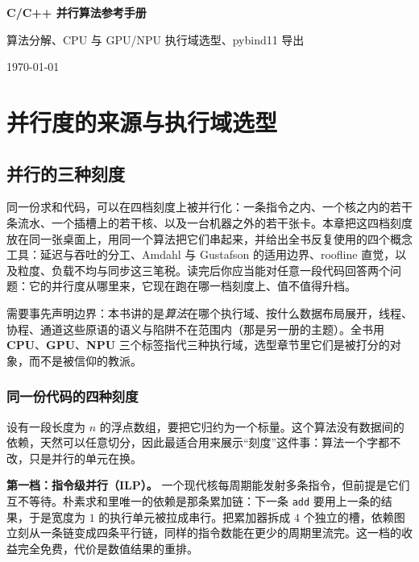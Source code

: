 \documentclass[12pt,a4paper,fontset=fandol]{ctexbook}
\newcommand{\Tp}[1]{\texttt{#1}}
\newcommand{\Dom}[1]{\textsf{\bfseries #1}}
\newcommand{\CPU}{\Dom{CPU}}
\newcommand{\GPU}{\Dom{GPU}}
\newcommand{\NPU}{\Dom{NPU}}
\begin{document}
\frontmatter

\begin{titlepage}
\centering
\vspace*{4cm}
{\Huge\bfseries C/C++ 并行算法参考手册\par}
\vspace{1cm}
{\LARGE 算法分解、CPU 与 GPU/NPU 执行域选型、pybind11 导出\par}
\vfill
{\large \today\par}
\end{titlepage}

\tableofcontents

\mainmatter

\cleardoublepage

\part{并行度的来源与执行域选型}

\chapter{并行的三种刻度}

同一份求和代码，可以在四档刻度上被并行化：一条指令之内、一个核之内的若干条流水、一个插槽上的若干核、以及一台机器之外的若干张卡。本章把这四档刻度放在同一张桌面上，用同一个算法把它们串起来，并给出全书反复使用的四个概念工具：延迟与吞吐的分工、Amdahl 与 Gustafson 的适用边界、roofline 直觉，以及粒度、负载不均与同步这三笔税。读完后你应当能对任意一段代码回答两个问题：它的并行度从哪里来，它现在跑在哪一档刻度上、值不值得升档。

需要事先声明边界：本书讲的是\emph{算法}在哪个执行域、按什么数据布局展开，线程、协程、通道这些原语的语义与陷阱不在范围内（那是另一册的主题）。全书用 \CPU、\GPU、\NPU{} 三个标签指代三种执行域，选型章节里它们是被打分的对象，而不是被信仰的教派。

\section{同一份代码的四种刻度}

设有一段长度为 $n$ 的浮点数组，要把它归约为一个标量。这个算法没有数据间的依赖，天然可以任意切分，因此最适合用来展示``刻度''这件事：算法一个字都不改，只是并行的单元在换。

\textbf{第一档：指令级并行（ILP）。} 一个现代核每周期能发射多条指令，但前提是它们互不等待。朴素求和里唯一的依赖是那条累加链：下一条 \Tp{add} 要用上一条的结果，于是宽度为 $1$ 的执行单元被拉成串行。把累加器拆成 $4$ 个独立的槽，依赖图立刻从一条链变成四条平行链，同样的指令数能在更少的周期里流完。这一档的收益完全免费，代价是数值结果的重排。
\end{document}
